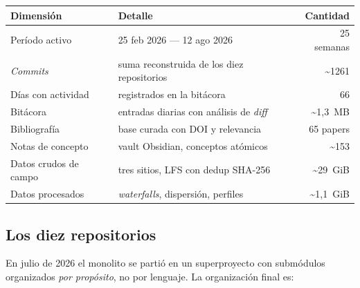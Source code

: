 \begin{center}\small
\begin{tabularx}{\textwidth}{@{}lX r@{}}
\toprule
\textbf{Dimensi\'on} & \textbf{Detalle} & \textbf{Cantidad} \\
\midrule
Per\'iodo activo & 25 feb 2026 --- 12 ago 2026 & 25 semanas \\
\emph{Commits} & suma reconstruida de los diez repositorios & \textasciitilde{}1261 \\
D\'ias con actividad & registrados en la bit\'acora & 66 \\
Bit\'acora & entradas diarias con an\'alisis de \emph{diff} & \textasciitilde{}1{,}3~MB \\
Bibliograf\'ia & base curada con DOI y relevancia & 65 papers \\
Notas de concepto & vault Obsidian, conceptos at\'omicos & \textasciitilde{}153 \\
Datos crudos de campo & tres sitios, LFS con dedup SHA-256 & \textasciitilde{}29~GiB \\
Datos procesados & \emph{waterfalls}, dispersi\'on, perfiles & \textasciitilde{}1{,}1~GiB \\
\bottomrule
\end{tabularx}
\end{center}

\subsection{Los diez repositorios}

En julio de 2026 el monolito se parti\'o en un superproyecto con subm\'odulos
organizados \emph{por prop\'osito}, no por lenguaje. La organizaci\'on final es:

